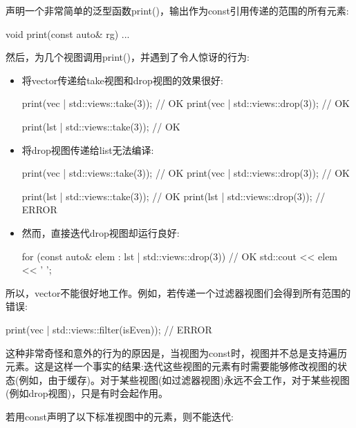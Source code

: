 声明一个非常简单的泛型函数print()，输出作为const引用传递的范围的所有元素:

\begin{cpp}
void print(const auto& rg)
{
	...
}
\end{cpp}

然后，为几个视图调用print()，并遇到了令人惊讶的行为:


\begin{itemize}
\item
将vector传递给take视图和drop视图的效果很好:

\begin{cpp}
print(vec | std::views::take(3)); // OK
print(vec | std::views::drop(3)); // OK

print(lst | std::views::take(3)); // OK
\end{cpp}

\item
将drop视图传递给list无法编译:

\begin{cpp}
print(vec | std::views::take(3)); // OK
print(vec | std::views::drop(3)); // OK

print(lst | std::views::take(3)); // OK
print(lst | std::views::drop(3)); // ERROR
\end{cpp}

\item
然而，直接迭代drop视图却运行良好:

\begin{cpp}
for (const auto& elem : lst | std::views::drop(3)) { // OK
	std::cout << elem << ' ';
}
\end{cpp}
\end{itemize}

所以，vector不能很好地工作。例如，若传递一个过滤器视图们会得到所有范围的错误:

\begin{cpp}
print(vec | std::views::filter(isEven)); // ERROR
\end{cpp}


这种非常奇怪和意外的行为的原因是，当视图为const时，视图并不总是支持遍历元素。这是这样一个事实的结果:迭代这些视图的元素有时需要能够修改视图的状态(例如，由于缓存)。对于某些视图(如过滤器视图)永远不会工作，对于某些视图(例如drop视图)，只是有时会起作用。

若用const声明了以下标准视图中的元素，则不能迭代:

